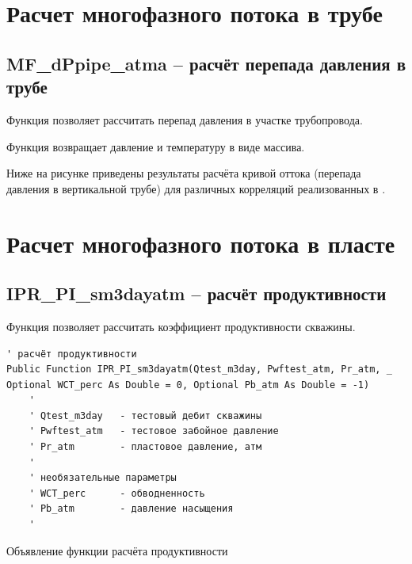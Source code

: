 \documentclass[]{scrreprt}
\begin{document}

\newpage
\section{Расчет многофазного потока в трубе}



\subsection{MF\_dPpipe\_atma – расчёт перепада давления в трубе}

Функция позволяет рассчитать перепад давления в участке трубопровода. 

Функция возвращает давление и температуру в виде массива.


Ниже на рисунке приведены результаты расчёта кривой оттока (перепада давления в вертикальной трубе) для различных корреляций реализованных в \unf.

\newcommand{\dPipeDataFile}{data/dPipe.txt}



\newpage
\section{Расчет многофазного потока в пласте}
\newpage
\subsection{IPR\_PI\_sm3dayatm – расчёт продуктивности}
Функция позволяет рассчитать коэффициент продуктивности скважины.
\begin{listing}[H]
	\begin{verbatim}
' расчёт продуктивности
Public Function IPR_PI_sm3dayatm(Qtest_m3day, Pwftest_atm, Pr_atm, _
Optional WCT_perc As Double = 0, Optional Pb_atm As Double = -1)
	'
	' Qtest_m3day   - тестовый дебит скважины
	' Pwftest_atm   - тестовое забойное давление
	' Pr_atm        - пластовое давление, атм
	'
	' необязательные параметры
	' WCT_perc      - обводненность
	' Pb_atm        - давление насыщения
	'
	\end{verbatim}
	\caption{Объявление функции расчёта продуктивности}
	\label{lst:codedIPR_PI}
\end{listing}
\newpage
\end{document}
